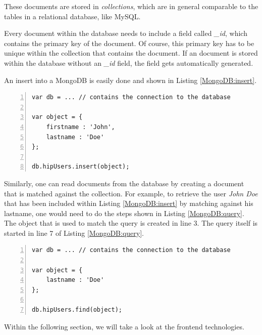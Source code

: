 These documents are stored in \emph{collections}, which are in general comparable to the tables in a relational database, like MySQL.

Every document within the database needs to include a field called \textit{\_id}, which contains the primary key of the document. Of course, this primary key has to be unique within the collection that contains the document. If an document is stored within the database without an \textit{\_id} field, the field gets automatically generated.

An insert into a MongoDB is easily done and shown in Listing \ref{MongoDB:insert}. 

\begin{lstlisting}[numbers=left,caption={Inserting into a MongoDB},label=MongoDB:insert,frame=tlbr,breaklines]
var db = ... // contains the connection to the database

var object = {
	firstname : 'John',
	lastname : 'Doe'
};

db.hipUsers.insert(object);
\end{lstlisting}

Similarly, one can read documents from the database by creating a document that is matched against the collection.
For example, to retrieve the user \textit{John Doe} that has been included within Listing \ref{MongoDB:insert} by matching against his lastname, one would need to do the steps shown in Listing \ref{MongoDB:query}. The object that is used to match the query is created in line 3. The query itself is started in line 7 of Listing \ref{MongoDB:query}.

\begin{lstlisting}[numbers=left,caption={Reading documents from a MongoDB},label=MongoDB:query,frame=tlbr,breaklines]
var db = ... // contains the connection to the database

var object = {
	lastname : 'Doe'
};

db.hipUsers.find(object);
\end{lstlisting}

Within the following section, we will take a look at the frontend technologies.

